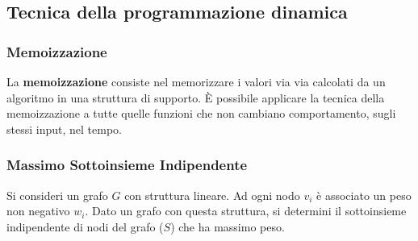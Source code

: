 \documentclass[11pt]{article}
\begin{document}
\subsection{Tecnica della programmazione dinamica}
\subsubsection{Memoizzazione}
La \textbf{memoizzazione} consiste nel memorizzare i valori via via calcolati da un algoritmo in una struttura di supporto.
È possibile applicare la tecnica della memoizzazione a tutte quelle funzioni che non cambiano comportamento, sugli stessi 
input, nel tempo.
\subsubsection{Massimo Sottoinsieme Indipendente}
Si consideri un grafo $G$ con struttura lineare. Ad ogni nodo $v_i$ è associato un peso non negativo $w_i$. 
Dato un grafo con questa struttura, si determini il sottoinsieme indipendente di nodi del grafo ($S$) che ha massimo peso. 
\end{document}
